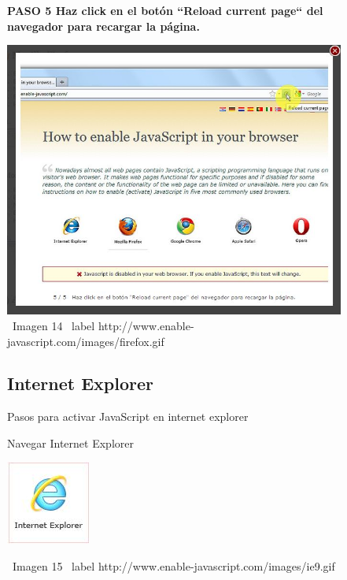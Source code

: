 \documentclass[11pt]{article} %
\begin{document}
\begin{figure}
\begin{center}
\begin{center}
\bf PASO 5
Haz click en el botón ``Reload current page`` del navegador para recargar la página.
\newline
\end{center}
\includegraphics[height=8 cm, width=8 cm] {imagenes/firefox 05.JPG}
\newline
\newline
\ Imagen 14
\ label {http://www.enable-javascript.com/images/firefox.gif }

\end{center}
\end{figure}

\begin{figure}
\subsection{Internet Explorer}
Pasos para activar JavaScript en internet explorer
\begin{center}
\begin{center}
Navegar Internet Explorer

\end{center}
\begin{center}
\includegraphics[height=3 cm, width=3 cm] {imagenes/explorer.JPG}
\end{center}

\ Imagen 15
\ label {http://www.enable-javascript.com/images/ie9.gif }

\end{center}
\end{figure}
\end{document}
